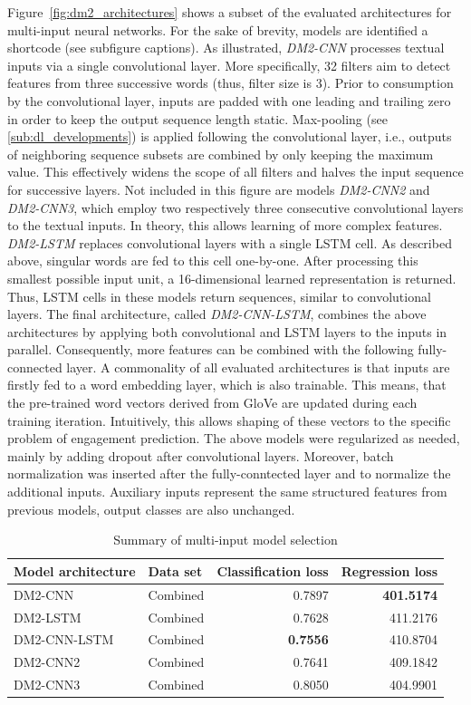 Figure~\ref{fig:dm2_architectures} shows a subset of the evaluated architectures for
multi-input neural networks.
For the sake of brevity, models are identified a shortcode (see subfigure captions).
As illustrated, \textit{DM2-CNN} processes textual inputs via a single convolutional
layer.
More specifically, 32 filters aim to detect features from three successive words
(thus, filter size is 3).
Prior to consumption by the convolutional layer, inputs are padded with one leading
and trailing zero in order to keep the output sequence length static.
Max-pooling (see \ref{sub:dl_developments}) is applied following the convolutional layer,
i.e., outputs of neighboring sequence subsets are combined by only keeping the
maximum value.
This effectively widens the scope of all filters and halves the input sequence
for successive layers.
Not included in this figure are models \textit{DM2-CNN2} and \textit{DM2-CNN3},
which employ two respectively three consecutive convolutional layers to the
textual inputs.
In theory, this allows learning of more complex features.
\textit{DM2-LSTM} replaces convolutional layers with a single LSTM cell.
As described above, singular words are fed to this cell one-by-one.
After processing this smallest possible input unit, a 16-dimensional learned
representation is returned.
Thus, LSTM cells in these models return sequences, similar to convolutional layers.
The final architecture, called \textit{DM2-CNN-LSTM}, combines the above
architectures by applying both convolutional and LSTM layers to the inputs
in parallel.
Consequently, more features can be combined with the following fully-connected
layer.
A commonality of all evaluated architectures is that inputs are firstly fed to
a word embedding layer, which is also trainable.
This means, that the pre-trained word vectors derived from GloVe are updated
during each training iteration.
Intuitively, this allows shaping of these vectors to the specific problem of
engagement prediction.
The above models were regularized as needed, mainly by adding dropout after
convolutional layers.
Moreover, batch normalization was inserted after the fully-conntected layer and
to normalize the additional inputs.
Auxiliary inputs represent the same structured features from previous models,
output classes are also unchanged.

\begin{table}
\begin{tabular}{llrr}
\toprule
Model architecture & Data set & Classification loss & Regression loss \\
\midrule
DM2-CNN & Combined & 0.7897 & \textbf{401.5174} \\
DM2-LSTM & Combined & 0.7628 & 411.2176 \\
DM2-CNN-LSTM & Combined & \textbf{0.7556} & 410.8704 \\
DM2-CNN2 & Combined & 0.7641 & 409.1842 \\
DM2-CNN3 & Combined & 0.8050 & 404.9901 \\
\bottomrule
\end{tabular}
\caption{Summary of multi-input model selection}
\label{tab:dm2_selection_results}
\end{table}

